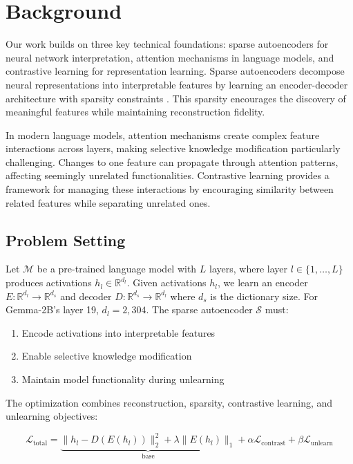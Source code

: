 \documentclass{article} %
\begin{document}
\section{Background}
\label{sec:background}

Our work builds on three key technical foundations: sparse autoencoders for neural network interpretation, attention mechanisms in language models, and contrastive learning for representation learning. Sparse autoencoders decompose neural representations into interpretable features by learning an encoder-decoder architecture with sparsity constraints \cite{goodfellow2016deep}. This sparsity encourages the discovery of meaningful features while maintaining reconstruction fidelity.

In modern language models, attention mechanisms \cite{vaswani2017attention} create complex feature interactions across layers, making selective knowledge modification particularly challenging. Changes to one feature can propagate through attention patterns, affecting seemingly unrelated functionalities. Contrastive learning \cite{radford2019language} provides a framework for managing these interactions by encouraging similarity between related features while separating unrelated ones.

\subsection{Problem Setting}
Let $\mathcal{M}$ be a pre-trained language model with $L$ layers, where layer $l \in \{1,\ldots,L\}$ produces activations $h_l \in \mathbb{R}^{d_l}$. Given activations $h_l$, we learn an encoder $E: \mathbb{R}^{d_l} \rightarrow \mathbb{R}^{d_s}$ and decoder $D: \mathbb{R}^{d_s} \rightarrow \mathbb{R}^{d_l}$ where $d_s$ is the dictionary size. For Gemma-2B's layer 19, $d_l = 2{,}304$. The sparse autoencoder $\mathcal{S}$ must:

\begin{enumerate}
    \item Encode activations into interpretable features
    \item Enable selective knowledge modification
    \item Maintain model functionality during unlearning
\end{enumerate}

The optimization combines reconstruction, sparsity, contrastive learning, and unlearning objectives:

\begin{equation}
    \mathcal{L}_{\text{total}} = \underbrace{\|h_l - D(E(h_l))\|_2^2 + \lambda\|E(h_l)\|_1}_{\text{base}} + \alpha\mathcal{L}_{\text{contrast}} + \beta\mathcal{L}_{\text{unlearn}}
\end{equation}
\end{document}
